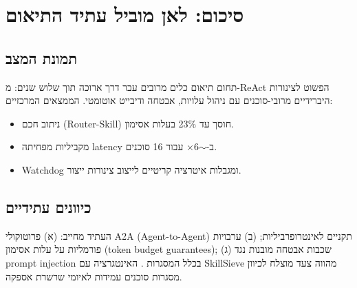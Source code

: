 
\clearpage
\chapter{סיכום: לאן מוביל עתיד התיאום}

\section{תמונת המצב}

תחום תיאום כלים מרובים עבר דרך ארוכה תוך שלוש שנים: מ-\textenglish{ReAct} הפשוט \cite{yao2022react} לצינורות היברידיים מרובי-סוכנים עם ניהול עלויות, אבטחה ודיבייט אוטומטי. הממצאים המרכזיים:

\begin{itemize}
\item ניתוב חכם (\textenglish{Router-Skill}) חוסך עד \textenglish{23\%} בעלות אסימון.
\item מקביליות מפחיתה \textenglish{latency} ב-\textenglish{$\sim$6×} עבור \textenglish{16} סוכנים.
\item \textenglish{Watchdog} ומגבלות איטרציה קריטיים לייצוב צינורות ייצור.
\end{itemize}

\section{כיוונים עתידיים}

העתיד מחייב: (א) פרוטוקולי \textenglish{A2A} (\textenglish{Agent-to-Agent}) תקניים לאינטרופרביליות; (ב) ערבויות פורמליות על עלות אסימון (\textenglish{token budget guarantees}); (ג) שכבות אבטחה מובנות נגד \textenglish{prompt injection} בכלל המסגרות \cite{nakash2024skillsieve}. האינטגרציה עם \textenglish{SkillSieve} \cite{nakash2024skillsieve} מהווה צעד מוצלח לכיוון מסגרות סוכנים עמידות לאיומי שרשרת אספקה.
